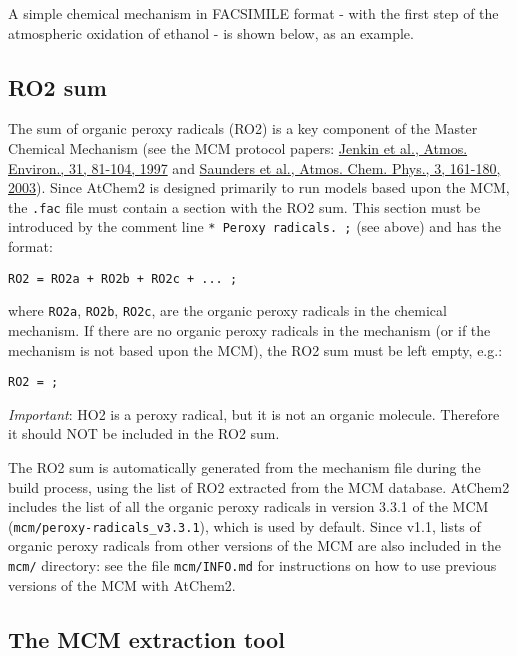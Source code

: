 A simple chemical mechanism in FACSIMILE format - with the first step of
the atmospheric oxidation of ethanol - is shown below, as an example.

\hypertarget{ro2-sum}{%
\subsection{RO2 sum}\label{ro2-sum}}

The sum of organic peroxy radicals (RO2) is a key component of the
Master Chemical Mechanism (see the MCM protocol papers:
\href{https://doi.org/10.1016/S1352-2310(96)00105-7}{Jenkin et al.,
Atmos. Environ., 31, 81-104, 1997} and
\href{https://doi.org/10.5194/acp-3-161-2003}{Saunders et al., Atmos.
Chem. Phys., 3, 161-180, 2003}). Since AtChem2 is designed primarily to
run models based upon the MCM, the \texttt{.fac} file must contain a
section with the RO2 sum. This section must be introduced by the comment
line \texttt{*\ Peroxy\ radicals.\ ;} (see above) and has the format:

\begin{verbatim}
RO2 = RO2a + RO2b + RO2c + ... ;
\end{verbatim}

where \texttt{RO2a}, \texttt{RO2b}, \texttt{RO2c}, are the organic
peroxy radicals in the chemical mechanism. If there are no organic
peroxy radicals in the mechanism (or if the mechanism is not based upon
the MCM), the RO2 sum must be left empty, e.g.:

\begin{verbatim}
RO2 = ;
\end{verbatim}

\emph{Important}: HO2 is a peroxy radical, but it is not an organic
molecule. Therefore it should NOT be included in the RO2 sum.

The RO2 sum is automatically generated from the mechanism file during
the build process, using the list of RO2 extracted from the MCM
database. AtChem2 includes the list of all the organic peroxy radicals
in version 3.3.1 of the MCM (\texttt{mcm/peroxy-radicals\_v3.3.1}),
which is used by default. Since v1.1, lists of organic peroxy radicals
from other versions of the MCM are also included in the \texttt{mcm/}
directory: see the file \texttt{mcm/INFO.md} for instructions on how to
use previous versions of the MCM with AtChem2.

\hypertarget{the-mcm-extraction-tool}{%
\subsection{The MCM extraction tool}\label{the-mcm-extraction-tool}}

